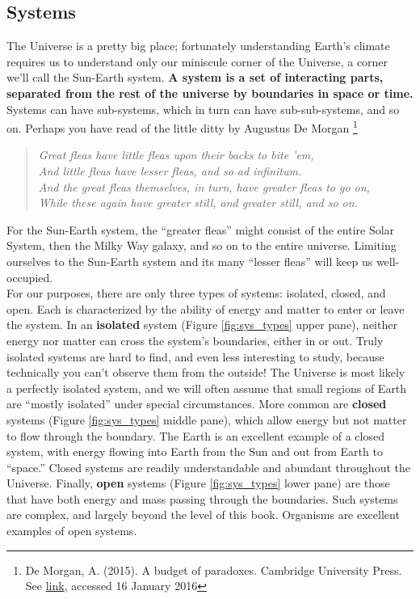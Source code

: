 \documentclass[amstex,12pt]{book}
\begin{document}
\subsection{Systems}
The Universe is a pretty big place; fortunately understanding Earth's climate requires us to understand only our miniscule corner of the Universe, a corner we'll call the Sun-Earth system. \textbf{A system is a set of interacting parts, separated from the rest of the universe by boundaries in space or time.} Systems can have sub-systems, which in turn can have sub-sub-systems, and so on. Perhaps you have read of the little ditty by Augustus De Morgan \footnote{De Morgan, A. (2015). A budget of paradoxes. Cambridge University Press. See \href{http://articles.latimes.com/1987-03-25/news/vw-191_1_fleast}{link}, accessed 16 January 2016}
\begin{quotation}\noindent\textit{Great fleas have little fleas upon their backs to bite 'em,\\
	And little fleas have lesser fleas, and so ad infinitum.\\
	And the great fleas themselves, in turn, have greater fleas to go on,\\
	While these again have greater still, and greater still, and so on.}
\end{quotation}
For the Sun-Earth system, the ``greater fleas'' might consist of the entire Solar System, then the Milky Way galaxy, and so on to the entire universe. Limiting ourselves to the Sun-Earth system and its many ``lesser fleas'' will keep us well-occupied.\\ 
For our purposes, there are only three types of systems: isolated, closed, and open. Each is characterized by the ability of energy and matter to enter or leave the system. In an \textbf{isolated} system (Figure \ref{fig:sys_types} upper pane), neither energy nor matter can cross the system’s boundaries, either in or out. Truly isolated systems are hard to find, and even less interesting to study, because technically you can't observe them from the outside! The Universe is most likely a perfectly isolated system, and we will often assume that small regions of Earth are ``mostly isolated'' under special circumstances. More common are \textbf{closed} systems (Figure \ref{fig:sys_types} middle pane), which allow energy but not matter to flow through the boundary. The Earth is an excellent example of a closed system, with energy flowing into Earth from the Sun and out from Earth to ``space.'' Closed systems are readily understandable and abundant throughout the Universe. Finally, \textbf{open} systems (Figure \ref{fig:sys_types} lower pane) are those that have both energy and mass passing through the boundaries. Such systems are complex, and largely beyond the level of this book. Organisms are excellent examples of open systems.\\
\end{document}
